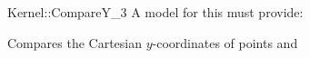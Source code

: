 \begin{ccRefFunctionObjectConcept}{Kernel::CompareY_3}
A model for this must provide:


      {Compares the Cartesian $y$-coordinates of points  and
      }

\ccSeeAlso
{}\\

\end{ccRefFunctionObjectConcept}
